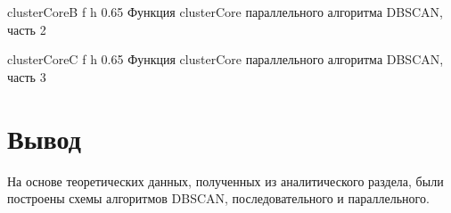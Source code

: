 {clusterCoreB} %
{f} %
{h} %
{0.65\textwidth} %
{Функция clusterCore параллельного алгоритма DBSCAN, часть 2} %
\clearpage

{clusterCoreC} %
{f} %
{h} %
{0.65\textwidth} %
{Функция clusterCore параллельного алгоритма DBSCAN, часть 3} %
\clearpage

\section*{Вывод}
На основе теоретических данных, полученных из аналитического раздела, были построены схемы алгоритмов DBSCAN, последовательного и параллельного.

